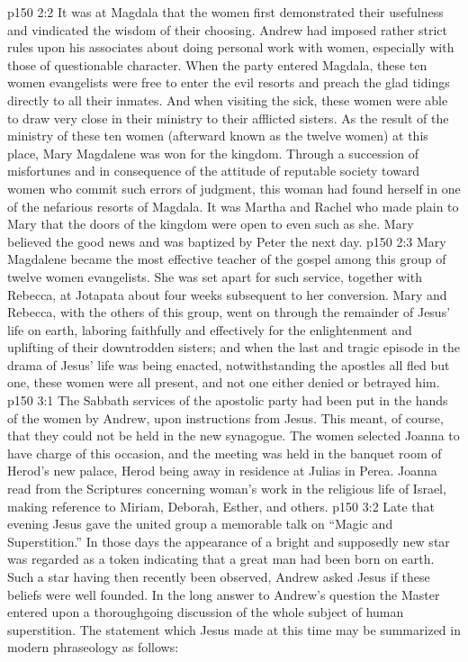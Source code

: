 \vs p150 2:2 It was at Magdala that the women first demonstrated their usefulness and vindicated the wisdom of their choosing. Andrew had imposed rather strict rules upon his associates about doing personal work with women, especially with those of questionable character. When the party entered Magdala, these ten women evangelists were free to enter the evil resorts and preach the glad tidings directly to all their inmates. And when visiting the sick, these women were able to draw very close in their ministry to their afflicted sisters. As the result of the ministry of these ten women (afterward known as the twelve women) at this place, Mary Magdalene was won for the kingdom. Through a succession of misfortunes and in consequence of the attitude of reputable society toward women who commit such errors of judgment, this woman had found herself in one of the nefarious resorts of Magdala. It was Martha and Rachel who made plain to Mary that the doors of the kingdom were open to even such as she. Mary believed the good news and was baptized by Peter the next day.
\vs p150 2:3 Mary Magdalene became the most effective teacher of the gospel among this group of twelve women evangelists. She was set apart for such service, together with Rebecca, at Jotapata about four weeks subsequent to her conversion. Mary and Rebecca, with the others of this group, went on through the remainder of Jesus’ life on earth, laboring faithfully and effectively for the enlightenment and uplifting of their downtrodden sisters; and when the last and tragic episode in the drama of Jesus’ life was being enacted, notwithstanding the apostles all fled but one, these women were all present, and not one either denied or betrayed him.
\vs p150 3:1 The Sabbath services of the apostolic party had been put in the hands of the women by Andrew, upon instructions from Jesus. This meant, of course, that they could not be held in the new synagogue. The women selected Joanna to have charge of this occasion, and the meeting was held in the banquet room of Herod’s new palace, Herod being away in residence at Julias in Perea. Joanna read from the Scriptures concerning woman’s work in the religious life of Israel, making reference to Miriam, Deborah, Esther, and others.
\pc \vs p150 3:2 Late that evening Jesus gave the united group a memorable talk on “Magic and Superstition.” In those days the appearance of a bright and supposedly new star was regarded as a token indicating that a great man had been born on earth. Such a star having then recently been observed, Andrew asked Jesus if these beliefs were well founded. In the long answer to Andrew’s question the Master entered upon a thoroughgoing discussion of the whole subject of human superstition. The statement which Jesus made at this time may be summarized in modern phraseology as follows:
